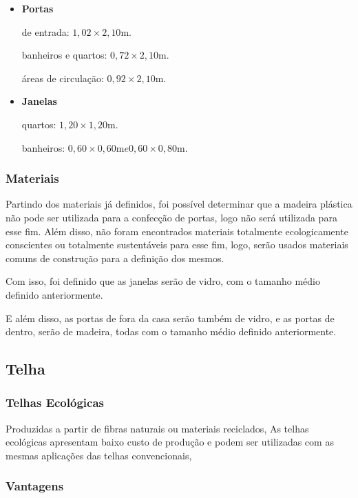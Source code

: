 	\begin{itemize}
	\item \textbf{Portas}

	de entrada: $1,02 \times 2,10 \si{\meter}$.

	banheiros e quartos: $0,72 \times 2,10 \si{\meter}$.

	áreas de circulação: $0,92 \times 2,10 \si{\meter}$.


	\item \textbf{Janelas}

	quartos: $1,20 \times 1,20 \si{\meter}$.

	banheiros: $0,60 \times 0,60 \si{\meter} e 0,60 \times 0,80 \si{\meter}$.

	\end{itemize}

\subsubsection*{\textbf{Materiais}}
	
	Partindo dos materiais já definidos, foi possível determinar que a madeira plástica não pode ser utilizada para a confecção de portas, logo não será utilizada para esse fim. Além disso, não foram encontrados materiais totalmente ecologicamente conscientes ou totalmente sustentáveis para esse fim, logo, serão usados materiais comuns de construção para a definição dos mesmos.

	Com isso, foi definido que as janelas serão de vidro, com o tamanho médio definido anteriormente.

	E além disso, as portas de fora da casa serão também de vidro, e as portas de dentro, serão de madeira, todas com o tamanho médio definido anteriormente\cite{2009Valente}.

\subsection{Telha}

\subsubsection*{\textbf{Telhas Ecológicas}}

	Produzidas a partir de fibras naturais ou materiais reciclados, As telhas ecológicas apresentam baixo custo de produção e podem ser utilizadas com as mesmas aplicações das telhas convencionais, 

\subsubsection*{\textbf{Vantagens}}

